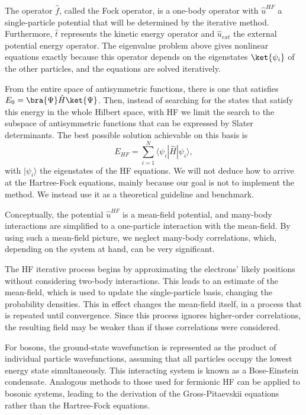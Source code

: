 The operator $\hat{f}$, called the Fock operator, is a one-body operator with $\hat{u}^{HF}$ a single-particle potential that will be determined by the iterative method. Furthermore, $\hat{t}$ represents the kinetic energy operator and $\hat{u}_{ext}$ the external potential energy operator. The eigenvalue problem above gives nonlinear equations exactly because this operator depends on the eigenstates $\ket{\psi_i}$ of the other particles, and the equations are solved iteratively. 

From the entire space of antisymmetric functions, there is one that satisfies $E_{0} = \bra{\Psi} \hat{H} \ket{\Psi}$. Then, instead of searching for the states that satisfy this energy in the whole Hilbert space, with HF we limit the search to the subspace of antisymmetric functions that can be expressed by Slater determinants. The best possible solution achievable on this basis is 
\begin{equation}
    E_{HF} = \sum_{i=1}^{N} \langle \psi_i | \hat{H} | \psi_i \rangle,
\end{equation}
with $| \psi_i \rangle$ the eigenstates of the HF equations. We will not deduce how to arrive at the Hartree-Fock equations, mainly because our goal is not to implement the method. We instead use it as a theoretical guideline and benchmark.

Conceptually, the potential $\hat{u}^{HF}$ is a mean-field potential, and many-body interactions are simplified to a one-particle interaction with the mean-field. By using such a mean-field picture, we neglect many-body correlations, which, depending on the system at hand, can be very significant.

The HF iterative process begins by approximating the electrons' likely positions without considering two-body interactions. This leads to an estimate of the mean-field, which is used to update the single-particle basis, changing the probability densities. This in effect changes the mean-field itself, in a process that is repeated until convergence. Since this process ignores higher-order correlations, the resulting field may be weaker than if those correlations were considered.

For bosons, the ground-state wavefunction is represented as the product of individual particle wavefunctions, assuming that all particles occupy the lowest energy state simultaneously. This interacting system is known as a Bose-Einstein condensate. Analogous methods to those used for fermionic HF can be applied to bosonic systems, leading to the derivation of the Gross-Pitaevskii equations \cite{rogel2013gross} rather than the Hartree-Fock equations.


